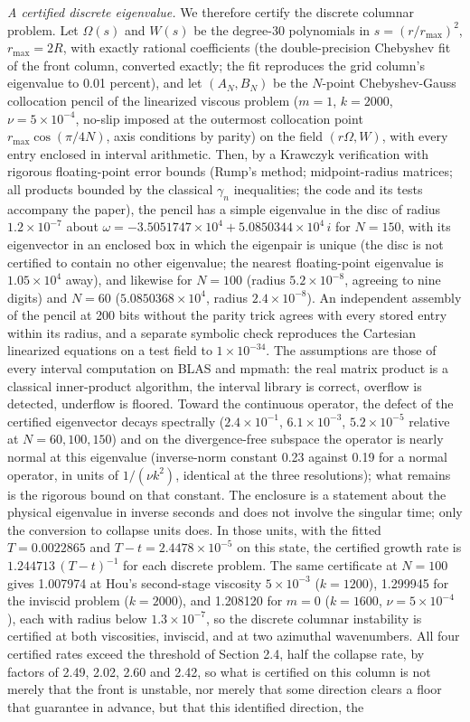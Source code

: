 \documentclass[11pt]{article}
\newcommand{\sn}[2]{#1\times 10^{#2}}
\begin{document}
\emph{A certified discrete eigenvalue.} We therefore certify the discrete columnar problem. Let $\Omega(s)$ and $W(s)$ be the degree-30 polynomials in $s = (r / r_{\max})^2$, $r_{\max} = 2R$, with exactly rational coefficients (the double-precision Chebyshev fit of the front column, converted exactly; the fit reproduces the grid column's eigenvalue to 0.01 percent), and let $(A_N, B_N)$ be the $N$-point Chebyshev-Gauss collocation pencil of the linearized viscous problem ($m = 1$, $k = 2000$, $\nu = \sn{5}{-4}$, no-slip imposed at the outermost collocation point $r_{\max} \cos(\pi / 4N)$, axis conditions by parity) on the field $(r \Omega, W)$, with every entry enclosed in interval arithmetic. Then, by a Krawczyk verification with rigorous floating-point error bounds (Rump's method; midpoint-radius matrices; all products bounded by the classical $\gamma_n$ inequalities; the code and its tests accompany the paper), the pencil has a simple eigenvalue in the disc of radius $\sn{1.2}{-7}$ about $\omega = -\sn{3.5051747}{4} + \sn{5.0850344}{4}\, i$ for $N = 150$, with its eigenvector in an enclosed box in which the eigenpair is unique (the disc is not certified to contain no other eigenvalue; the nearest floating-point eigenvalue is $\sn{1.05}{4}$ away), and likewise for $N = 100$ (radius $\sn{5.2}{-8}$, agreeing to nine digits) and $N = 60$ ($\sn{5.0850368}{4}$, radius $\sn{2.4}{-8}$). An independent assembly of the pencil at 200 bits without the parity trick agrees with every stored entry within its radius, and a separate symbolic check reproduces the Cartesian linearized equations on a test field to $\sn{1}{-34}$. The assumptions are those of every interval computation on BLAS and mpmath: the real matrix product is a classical inner-product algorithm, the interval library is correct, overflow is detected, underflow is floored. Toward the continuous operator, the defect of the certified eigenvector decays spectrally ($\sn{2.4}{-1}$, $\sn{6.1}{-3}$, $\sn{5.2}{-5}$ relative at $N = 60, 100, 150$) and on the divergence-free subspace the operator is nearly normal at this eigenvalue (inverse-norm constant 0.23 against 0.19 for a normal operator, in units of $1 / (\nu k^2)$, identical at the three resolutions); what remains is the rigorous bound on that constant. The enclosure is a statement about the physical eigenvalue in inverse seconds and does not involve the singular time; only the conversion to collapse units does. In those units, with the fitted $T = 0.0022865$ and $T - t = \sn{2.4478}{-5}$ on this state, the certified growth rate is $1.244713\,(T - t)^{-1}$ for each discrete problem. The same certificate at $N = 100$ gives 1.007974 at Hou's second-stage viscosity $\sn{5}{-3}$ ($k = 1200$), 1.299945 for the inviscid problem ($k = 2000$), and 1.208120 for $m = 0$ ($k = 1600$, $\nu = \sn{5}{-4}$), each with radius below $\sn{1.3}{-7}$, so the discrete columnar instability is certified at both viscosities, inviscid, and at two azimuthal wavenumbers. All four certified rates exceed the threshold of Section 2.4, half the collapse rate, by factors of 2.49, 2.02, 2.60 and 2.42, so what is certified on this column is not merely that the front is unstable, nor merely that some direction clears a floor that \cite{VV20,LVV21} guarantee in advance, but that this identified direction, the 
\end{document}

